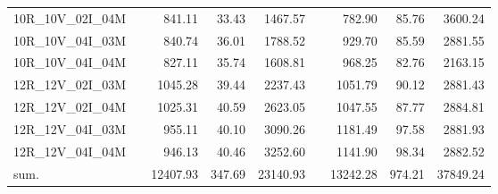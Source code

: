 \begin{tabular}{llrrrlrrr}
10R\_10V\_02I\_04M & \hspace{0.1cm} & 841.11 & 33.43 & 1467.57 & \hspace{0.2cm} & 782.90 & 85.76 & 3600.24\\
10R\_10V\_04I\_03M & \hspace{0.1cm} & 840.74 & 36.01 & 1788.52 & \hspace{0.2cm} & 929.70 & 85.59 & 2881.55\\
10R\_10V\_04I\_04M & \hspace{0.1cm} & 827.11 & 35.74 & 1608.81 & \hspace{0.2cm} & 968.25 & 82.76 & 2163.15\\
\addlinespace
12R\_12V\_02I\_03M & \hspace{0.1cm} & 1045.28 & 39.44 & 2237.43 & \hspace{0.2cm} & 1051.79 & 90.12 & 2881.43\\
12R\_12V\_02I\_04M & \hspace{0.1cm} & 1025.31 & 40.59 & 2623.05 & \hspace{0.2cm} & 1047.55 & 87.77 & 2884.81\\
12R\_12V\_04I\_03M & \hspace{0.1cm} & 955.11 & 40.10 & 3090.26 & \hspace{0.2cm} & 1181.49 & 97.58 & 2881.93\\
12R\_12V\_04I\_04M & \hspace{0.1cm} & 946.13 & 40.46 & 3252.60 & \hspace{0.2cm} & 1141.90 & 98.34 & 2882.52\\
\addlinespace
sum. & \hspace{0.1cm} & 12407.93 & 347.69 & 23140.93 & \hspace{0.2cm} & 13242.28 & 974.21 & 37849.24\\
\bottomrule
\end{tabular}
